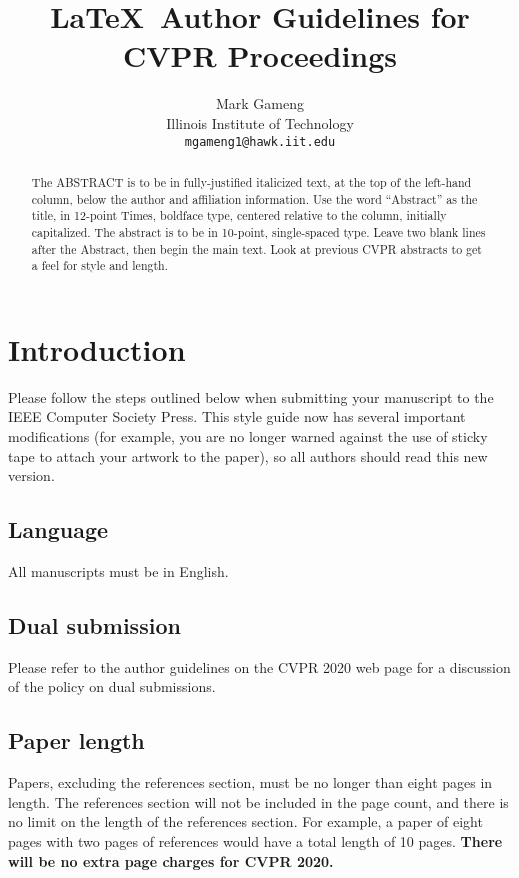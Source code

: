 \documentclass[10pt,twocolumn,letterpaper]{article}
\begin{document}
	
	\title{\LaTeX\ Author Guidelines for CVPR Proceedings}
	
	\author{Mark Gameng\\
		Illinois Institute of Technology\\
		{\tt\small mgameng1@hawk.iit.edu}
	}
	
	\maketitle
	
	\begin{abstract}
		The ABSTRACT is to be in fully-justified italicized text, at the top
		of the left-hand column, below the author and affiliation
		information. Use the word ``Abstract'' as the title, in 12-point
		Times, boldface type, centered relative to the column, initially
		capitalized. The abstract is to be in 10-point, single-spaced type.
		Leave two blank lines after the Abstract, then begin the main text.
		Look at previous CVPR abstracts to get a feel for style and length.
	\end{abstract}
	
	\section{Introduction}
	
	Please follow the steps outlined below when submitting your manuscript to
	the IEEE Computer Society Press.  This style guide now has several
	important modifications (for example, you are no longer warned against the
	use of sticky tape to attach your artwork to the paper), so all authors
	should read this new version.
	
	\subsection{Language}
	
	All manuscripts must be in English.
	
	\subsection{Dual submission}
	
	Please refer to the author guidelines on the CVPR 2020 web page for a
	discussion of the policy on dual submissions.
	
	\subsection{Paper length}
	Papers, excluding the references section,
	must be no longer than eight pages in length. The references section
	will not be included in the page count, and there is no limit on the
	length of the references section. For example, a paper of eight pages
	with two pages of references would have a total length of 10 pages.
	{\bf There will be no extra page charges for CVPR 2020.}
	
\end{document}
